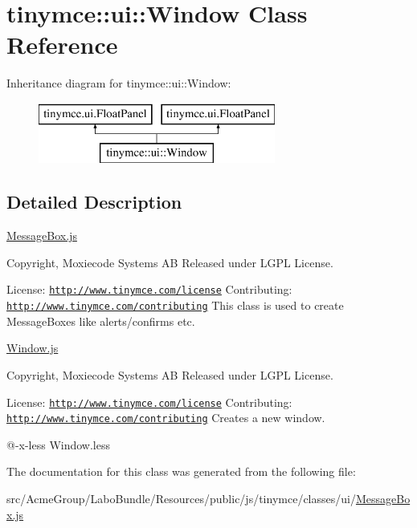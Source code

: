 \hypertarget{classtinymce_1_1ui_1_1_window}{\section{tinymce\+:\+:ui\+:\+:Window Class Reference}
\label{classtinymce_1_1ui_1_1_window}
}
Inheritance diagram for tinymce\+:\+:ui\+:\+:Window\+:\begin{figure}[H]
\begin{center}
\leavevmode
\includegraphics[height=2.000000cm]{classtinymce_1_1ui_1_1_window}
\end{center}
\end{figure}


\subsection{Detailed Description}
\hyperlink{_message_box_8js}{Message\+Box.\+js}

Copyright, Moxiecode Systems A\+B Released under L\+G\+P\+L License.

License\+: \href{http://www.tinymce.com/license}{\tt http\+://www.\+tinymce.\+com/license} Contributing\+: \href{http://www.tinymce.com/contributing}{\tt http\+://www.\+tinymce.\+com/contributing} This class is used to create Message\+Boxes like alerts/confirms etc.

\hyperlink{_window_8js}{Window.\+js}

Copyright, Moxiecode Systems A\+B Released under L\+G\+P\+L License.

License\+: \href{http://www.tinymce.com/license}{\tt http\+://www.\+tinymce.\+com/license} Contributing\+: \href{http://www.tinymce.com/contributing}{\tt http\+://www.\+tinymce.\+com/contributing} Creates a new window.

@-\/x-\/less Window.\+less 

The documentation for this class was generated from the following file\+:\begin{DoxyCompactItemize}
\item 
src/\+Acme\+Group/\+Labo\+Bundle/\+Resources/public/js/tinymce/classes/ui/\hyperlink{_message_box_8js}{Message\+Box.\+js}\end{DoxyCompactItemize}
